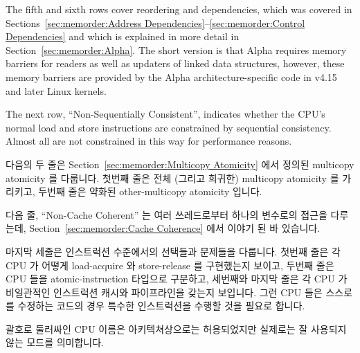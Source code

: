 The fifth and sixth rows cover reordering and dependencies,
which was covered in
Sections~\ref{sec:memorder:Address Dependencies}--\ref{sec:memorder:Control Dependencies}
and which is explained in more detail in
Section~\ref{sec:memorder:Alpha}.
The short version is that Alpha requires memory barriers for readers
as well as updaters of linked data structures, however, these memory
barriers are provided by the Alpha architecture-specific code in
v4.15 and later Linux kernels.

The next row, ``Non-Sequentially Consistent'', indicates whether
the CPU's normal load and store instructions are constrained by
sequential consistency.
Almost all are not constrained in this way for performance reasons.
\fi

다음의 두 줄은
Section~\ref{sec:memorder:Multicopy Atomicity} 에서 정의된 multicopy atomicity
를 다룹니다.
첫번째 줄은 전체 (그리고 희귀한) multicopy atomicity 를 가리키고, 두번째 줄은
약화된 other-multicopy atomicity 입니다.

다음 줄, ``Non-Cache Coherent'' 는 여러 쓰레드로부터 하나의 변수로의 접근을
다루는데,
Section~\ref{sec:memorder:Cache Coherence} 에서 이야기 된 바 있습니다.

마지막 세줄은 인스트럭션 수준에서의 선택들과 문제들을 다룹니다.
첫번째 줄은 각 CPU 가 어떻게 load-acquire 와 store-release 를 구현했는지
보이고, 두번째 줄은 CPU 들을 atomic-instruction 타입으로 구분하고, 세번째와
마지막 줄은 각 CPU 가 비일관적인 인스트럭션 캐시와 파이프라인을 갖는지
보입니다.
그런 CPU 들은 스스로를 수정하는 코드의 경우 특수한 인스트럭션을 수행할 것을
필요로 합니다.

괄호로 둘러싸인 CPU 이름은 아키텍쳐상으로는 허용되었지만 실제로는 잘 사용되지
않는 모드를 의미합니다.

